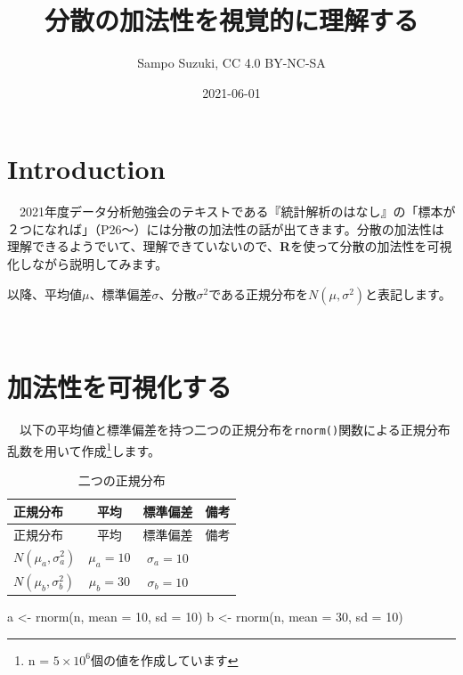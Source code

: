 \documentclass[a4paper]{tufte-handout}
\title[分散の加法性を視覚的に理解する]{分散の加法性を視覚的に理解する}
\author{Sampo Suzuki, CC 4.0 BY-NC-SA}
\date{2021-06-01}
\newenvironment{Shaded}{}{}
\newcommand{\AttributeTok}[1]{\textcolor[rgb]{0.49,0.56,0.16}{#1}}
\newcommand{\DecValTok}[1]{\textcolor[rgb]{0.25,0.63,0.44}{#1}}
\newcommand{\FunctionTok}[1]{\textcolor[rgb]{0.02,0.16,0.49}{#1}}
\newcommand{\NormalTok}[1]{#1}
\newcommand{\OtherTok}[1]{\textcolor[rgb]{0.00,0.44,0.13}{#1}}
\begin{document}
\maketitle




\hypertarget{introduction}{%
\section{\texorpdfstring{\textbf{Introduction}}{Introduction}}\label{introduction}}

　2021年度データ分析勉強会のテキストである『統計解析のはなし』\citep{ToukeiKaisekinoHanashi}の「標本が２つになれば」（P26〜）には分散の加法性の話が出てきます。分散の加法性は理解できるようでいて、理解できていないので、\textbf{R}を使って分散の加法性を可視化しながら説明してみます。

以降、平均値\(\mu\)、標準偏差\(\sigma\)、分散\(\sigma^2\)である正規分布を\(N(\mu, \sigma^2)\)と表記します。

　

\hypertarget{ux52a0ux6cd5ux6027ux3092ux53efux8996ux5316ux3059ux308b}{%
\section{\texorpdfstring{\textbf{加法性を可視化する}}{加法性を可視化する}}\label{ux52a0ux6cd5ux6027ux3092ux53efux8996ux5316ux3059ux308b}}

　以下の平均値と標準偏差を持つ二つの正規分布を\texttt{rnorm()}関数による正規分布乱数を用いて作成\footnote{n
  = \ensuremath{5\times 10^{6}}個の値を作成しています}します。

\begin{longtable}[]{@{}lccl@{}}
\caption{二つの正規分布}\tabularnewline
\toprule
正規分布 & 平均 & 標準偏差 & 備考 \\
\midrule
\endfirsthead
\toprule
正規分布 & 平均 & 標準偏差 & 備考 \\
\midrule
\endhead
\(N(\mu_a, \sigma^2_a)\) & \(\mu_a = 10\) & \(\sigma_a = 10\) & \\
\(N(\mu_b, \sigma^2_b)\) & \(\mu_b = 30\) & \(\sigma_b = 10\) & \\
\bottomrule
\end{longtable}

\begin{Shaded}
\begin{Highlighting}[numbers=left,,]
\NormalTok{a }\OtherTok{\textless{}{-}} \FunctionTok{rnorm}\NormalTok{(n, }\AttributeTok{mean =} \DecValTok{10}\NormalTok{, }\AttributeTok{sd =} \DecValTok{10}\NormalTok{)}
\NormalTok{b }\OtherTok{\textless{}{-}} \FunctionTok{rnorm}\NormalTok{(n, }\AttributeTok{mean =} \DecValTok{30}\NormalTok{, }\AttributeTok{sd =} \DecValTok{10}\NormalTok{)}
\end{Highlighting}
\end{Shaded}
\end{document}
